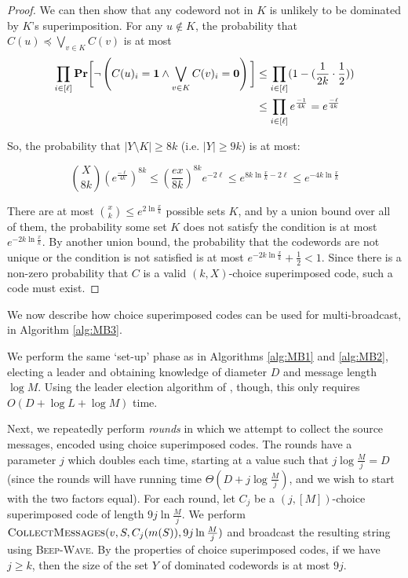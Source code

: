 \documentclass{article}
\newcommand{\Prob}[1]{\mathbf{Pr}\bigg[#1\bigg]}
\begin{document}
\begin{proof}
	We can then show that any codeword not in $K$ is unlikely to be dominated by $K$'s superimposition. For any $u\notin K$, the probability that $C(u)\preceq\bigvee_{v\in K}C(v)$ is at most
	\begin{align*}
	\prod_{i\in [\ell]} \Prob{\lnot \left(C(u)_i = \textbf 1\land \bigvee_{v\in K}C(v)_i = \textbf 0\right)} &\leq \prod_{i\in [\ell]} (1-(\frac {1}{2k}\cdot \frac 12))\\
	&\leq \prod_{i\in [\ell]} e^{\frac {-1}{4k}} = e^{\frac{-\ell}{4k}}
	\end{align*}
	
	So, the probability that $|Y\setminus K|\geq 8k$ (i.e. $|Y|\geq 9k$) is at most:
	
	\[\binom{X}{8k}  (e^{\frac{-\ell}{4k}})^{8k} \leq \left(\frac{ex}{8k}\right)^{8k}e^{-2\ell}\leq e^{8k\ln \frac xk - 2\ell}\leq e^{-4k\ln\frac xk}\]
	
	There are at most 
	$\binom xk \leq e^{2\ln\frac xk}$ 
	possible sets $K$, and by a union bound over all of them, the probability some set $K$ does not satisfy the condition is at  most $e^{-2k\ln\frac xk}$. By another union bound, the probability that the codewords are not unique or the condition is not satisfied is at most $e^{-2k\ln\frac xk}+\frac 12 < 1$. Since there is a non-zero probability that $C$ is a valid $(k,X)$-choice superimposed code, such a code must exist.
\end{proof}


We now describe how choice superimposed codes can be used for multi-broadcast, in Algorithm \ref{alg:MB3}. 

We perform the same `set-up' phase as in Algorithms \ref{alg:MB1} and \ref{alg:MB2}, electing a leader and obtaining knowledge of diameter $D$ and message length $\log M$. Using the leader election algorithm of \cite{-DBB18}, though, this only requires $O(D+\log L + \log M)$ time. 

Next, we repeatedly perform \emph{rounds} in which we attempt to collect the source messages, encoded using choice superimposed codes. The rounds have a parameter $j$ which doubles each time, starting at a value such that $j\log \frac {M}{j} = D$ (since the rounds will have running time $\Theta(D+j\log \frac {M}{j})$, and we wish to start with the two factors equal). For each round, let $C_j$ be a $(j,[M])$-choice superimposed code of length $9j\ln\frac Mj$. We perform $\textsc{CollectMessages}(v,S,C_j(m(S)), 9j\ln \frac {M}{j})$ and broadcast the resulting string using \textsc{Beep-Wave}. By the properties of choice superimposed codes, if we have $j\geq k$, then the size of the set $Y$ of dominated codewords is at most $9j$. 
\end{document}
